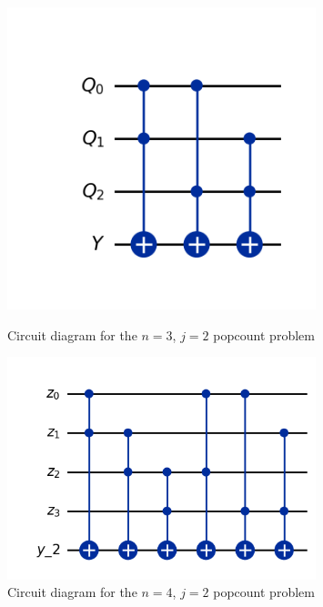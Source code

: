 \documentclass[12pt,a4paper]{article}
\begin{document}
\begin{figure}[t] 
    \begin{minipage}{.45\textwidth}
        \centering \includegraphics[width=0.8\textwidth]{Figures/n3j2_circuit_diagram.png} 
        \caption{Circuit diagram for the \(n=3\), \(j=2\) popcount problem} 
        \label{fig:n3j2}
    \end{minipage}
    \qquad
    \begin{minipage}{.45\textwidth}
        \centering \includegraphics[width=0.8\textwidth]{Figures/toffoli_j=2_n=4.png} 
        \caption{Circuit diagram for the \(n=4\), \(j=2\) popcount problem} 
        \label{fig:n4j2_toffoli} 
    \end{minipage}
\end{figure}
\end{document}
